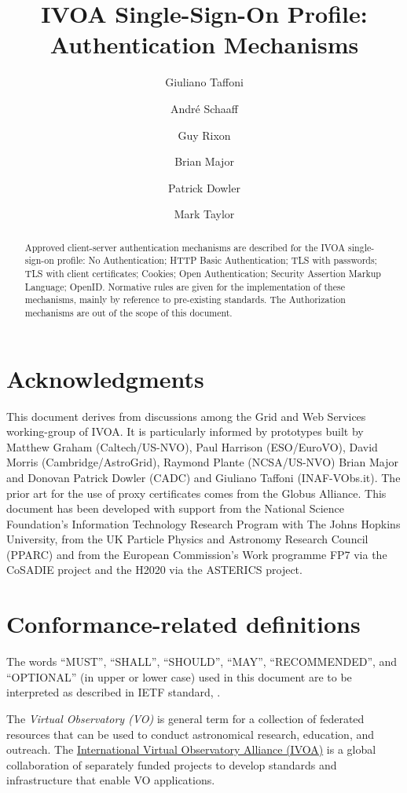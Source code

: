 \documentclass[11pt,a4paper]{ivoa}
\title{IVOA Single-Sign-On Profile: Authentication Mechanisms}
\author{Giuliano Taffoni}
\author{Andr\'e Schaaff}
\author{Guy Rixon}
\author{Brian Major}
\author{Patrick Dowler}
\author{Mark Taylor}
\begin{document}
\begin{abstract}
Approved client-server authentication mechanisms are described for the
IVOA single-sign-on profile: No Authentication; HTTP Basic
Authentication; TLS with passwords; TLS with client certificates;
Cookies; Open Authentication; Security Assertion Markup Language;
OpenID. Normative rules are given for the implementation of these
mechanisms, mainly by reference to pre-existing standards. The
Authorization mechanisms are out of the scope of this document.
\end{abstract}

\section*{Acknowledgments}

This document derives from discussions among the Grid and Web Services
working-group of IVOA. It is particularly informed by prototypes built
by Matthew Graham (Caltech/US-NVO), Paul Harrison (ESO/EuroVO), David
Morris (Cambridge/AstroGrid), Raymond Plante (NCSA/US-NVO) Brian Major
and  Donovan Patrick Dowler (CADC) and Giuliano Taffoni (INAF-VObs.it).
The prior art for the use of proxy certificates comes from the Globus
Alliance.
This document has been developed with support from the National Science
Foundation's Information Technology Research Program  with The Johns
Hopkins University, from the UK Particle Physics and Astronomy Research
Council (PPARC) and from the European Commission's Work programme FP7
via the  CoSADIE project and the H2020 via the ASTERICS project.


\section*{Conformance-related definitions}
The words ``MUST'', ``SHALL'', ``SHOULD'', ``MAY'', ``RECOMMENDED'', and
``OPTIONAL'' (in upper or lower case) used in this document are to be
interpreted as described in IETF standard, \citet{std:RFC2119}.

The \emph{Virtual Observatory (VO)} is
general term for a collection of federated resources that can be used
to conduct astronomical research, education, and outreach.
The \href{http://www.ivoa.net}{International
Virtual Observatory Alliance (IVOA)} is a global
collaboration of separately funded projects to develop standards and
infrastructure that enable VO applications.
\end{document}

